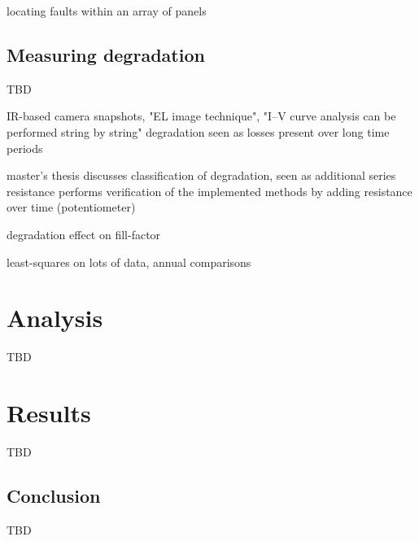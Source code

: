 locating faults within an array of panels \cite{Lin2012}

\section{Measuring degradation}
TBD

IR-based camera snapshots, "EL image technique", "I–V curve analysis can be performed string by string" \cite{Munoz2011}
degradation seen as losses present over long time periods \cite{Stettler2005}

master's thesis discusses classification of degradation, seen as additional series resistance \cite{Zhao2010thesis}
performs verification of the implemented methods by adding resistance over time (potentiometer)

degradation effect on fill-factor \cite{Raina2013}

least-squares on lots of data, annual comparisons \cite{Makrides2010}




\chapter{Analysis}
TBD


\chapter{Results}
TBD

\section{Conclusion}
TBD





